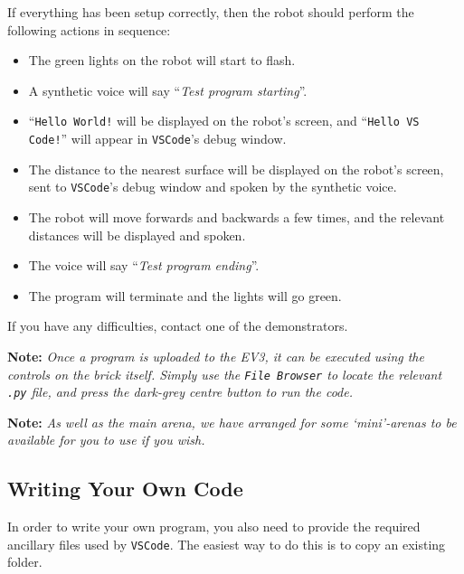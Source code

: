 \documentclass[hidelinks,a4paper,11pt]{article}
\begin{document}
If everything has been setup correctly, then the robot should perform the following actions in sequence:
\begin{itemize}
	\item The green lights on the robot will start to flash.
	\item A synthetic voice will say ``\emph{Test program starting}''.
	\item ``\texttt{Hello World!} will be displayed on the robot's screen, and ``\texttt{Hello VS Code!}'' will appear in \texttt{VSCode}'s debug window.
	\item The distance to the nearest surface will be displayed on the robot's screen, sent to \texttt{VSCode}'s debug window and spoken by the synthetic voice.
	\item The robot will move forwards and backwards a few times, and the relevant distances will be displayed and spoken. 
	\item The voice will say ``\emph{Test program ending}''.
	\item The program will terminate and the lights will go green.
\end{itemize}

If you have any difficulties, contact one of the demonstrators.  

{\bfseries Note:}  \emph{Once a program is uploaded to the EV3, it can be executed using the controls on the brick itself.  Simply use the \texttt{File Browser} to locate the relevant \texttt{.py} file, and press the dark-grey centre button to run the code.}

{\bfseries Note:}  \emph{As well as the main arena, we have arranged for some `mini'-arenas to be available for you to use if you wish.}


\subsection{Writing Your Own Code}

In order to write your own program, you also need to provide the required ancillary files used by \texttt{VSCode}.  The easiest way to do this is to copy an existing folder.
\end{document}
